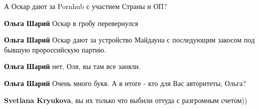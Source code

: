 \begin{itemize}
 
А Оскар дают за Pornhub с участием Страны и ОП?

\begin{itemize}
 
\textbf{Ольга Шарий} Оскар в гробу перевернулся

 
\textbf{Ольга Шарий} Оскар дают за устройство Майдауна с последующим закосом под бывшую пророссийскую партию.


 
\textbf{Ольга Шарий} нет, Оля, вы там все заняли.

 
\textbf{Ольга Шарий} Очень много букв. А в итоге - кто для Вас авторитеты, Ольга?

 
\textbf{Svetlana Kryukova}, вы их только что выбили оттуда с разгромным счетом))

 

\end{itemize}
\end{itemize}
